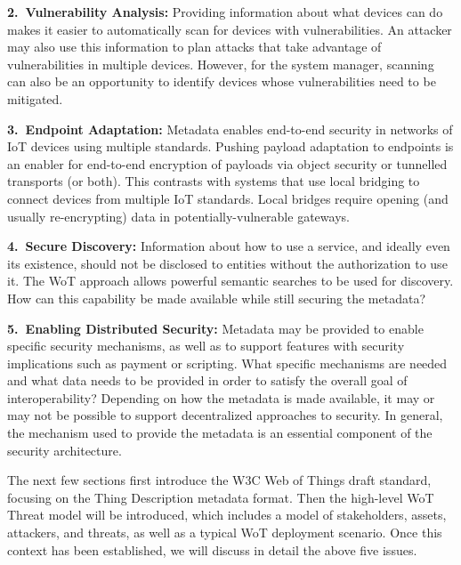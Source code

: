 \noindent\textbf{2.~Vulnerability Analysis:}
Providing information about what devices can do makes it easier to 
automatically scan for devices with vulnerabilities.
An attacker may also use this information to plan attacks that take advantage of 
vulnerabilities in multiple devices. 
However, for the system manager, scanning can also be an opportunity 
to identify devices whose vulnerabilities need to be mitigated.

\noindent\textbf{3.~Endpoint Adaptation:}
Metadata enables end-to-end security in networks of IoT devices using multiple standards.
Pushing payload adaptation to endpoints is an enabler for
end-to-end encryption of payloads via object security or tunnelled transports (or both).
This contrasts with systems that use local bridging to connect devices from multiple IoT standards.
Local bridges require opening (and usually re-encrypting) data in potentially-vulnerable gateways.

\noindent\textbf{4.~Secure Discovery:}
Information about how to use a service, 
and ideally even its existence, should not
be disclosed to entities without the authorization to use it.
The WoT approach allows powerful semantic searches to be used for discovery.
How can this capability be made available while still securing the metadata?

\noindent\textbf{5.~Enabling Distributed Security:}
Metadata may be provided to enable specific security mechanisms,
as well as to support features with security implications such as payment or scripting.
What specific mechanisms are needed and what data needs to be provided
in order to satisfy the overall goal of interoperability?
Depending on how the metadata is made available, it may or may not be 
possible to support decentralized approaches to security.
In general, the mechanism used to provide the metadata is
an essential component of the security architecture.

The next few sections first introduce the W3C Web of Things draft standard,
focusing on the Thing Description metadata format.  
Then the high-level WoT Threat model will be introduced,
which includes a model of stakeholders, assets, attackers,
and threats, as well as a typical WoT deployment scenario.
Once this context has been established, we will discuss in detail the above
five issues.

